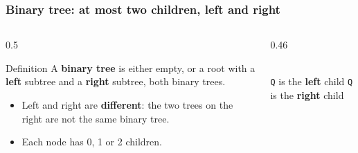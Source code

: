 \documentclass[aspectratio=169,10pt,compress]{beamer}
\begin{document}
\begin{frame}[t,fragile] \frametitle{Binary tree: at most two children, left and right}
  \begin{columns}[T]
    \begin{column}{0.5\textwidth}
      \begin{block}{Definition}
        A \textbf{binary tree} is either empty, or a root with a \textbf{left} subtree and a \textbf{right} subtree, both binary trees.
      \end{block}
      \begin{itemize}\small
        \item Left and right are \textbf{different}: the two trees on the right are not the same binary tree.
        \item Each node has 0, 1 or 2 children.
      \end{itemize}
    \end{column}
    \begin{column}{0.46\textwidth}
      \begin{center}
      \qquad
      \\[0.3em]
      \small \texttt{Q} is the \textbf{left} child \quad\quad \texttt{Q} is the \textbf{right} child
      \end{center}
    \end{column}
  \end{columns}
\end{frame}
\end{document}
